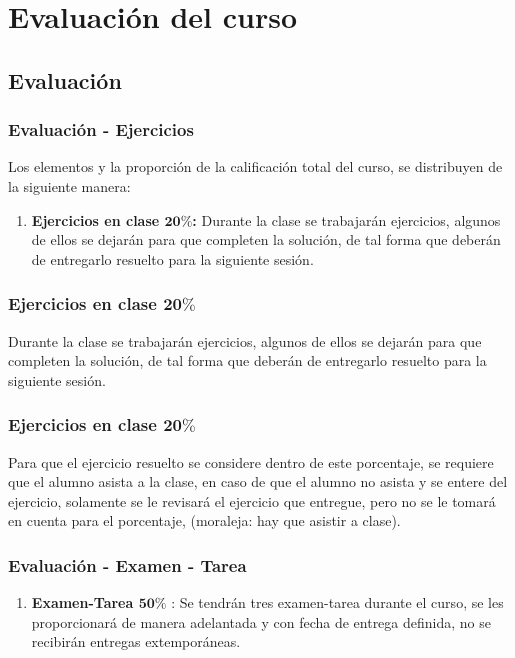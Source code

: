 \documentclass[12pt]{beamer}
\begin{document}
\section{Evaluación del curso}
\subsection{Evaluación}

\begin{frame}
\frametitle{Evaluación - Ejercicios}
Los elementos y la proporción de la calificación total del curso, se distribuyen de la siguiente manera:
\begin{enumerate}[<+->]
\item \textbf{Ejercicios en clase $\mathbf{20\%}$:} Durante la clase se trabajarán ejercicios, algunos de ellos se dejarán para que completen la solución, de tal forma que deberán de entregarlo resuelto para la siguiente sesión.
\\
\bigskip
\pause
\seti
\end{enumerate}
\end{frame}
\begin{frame}
\frametitle{Ejercicios en clase $\mathbf{20\%}$}
Durante la clase se trabajarán ejercicios, algunos de ellos se dejarán para que completen la solución, de tal forma que deberán de entregarlo resuelto para la siguiente sesión.
\end{frame}
\begin{frame}
\frametitle{Ejercicios en clase $\mathbf{20\%}$}
Para que el ejercicio resuelto se considere dentro de este porcentaje, se requiere que el alumno asista a la clase, en caso de que el alumno no asista y se entere del ejercicio, solamente se le revisará el ejercicio que entregue, pero no se le tomará en cuenta para el porcentaje, (moraleja: hay que asistir a clase).
\end{frame}
\begin{frame}
\frametitle{Evaluación - Examen - Tarea}
\begin{enumerate}[<+->]    
\conti
\item \textbf{Examen-Tarea $\mathbf{50\%}$} : Se tendrán tres examen-tarea durante el curso, se les proporcionará de manera adelantada y con fecha de entrega definida, no se recibirán entregas extemporáneas.
\seti
\end{enumerate}
\end{frame}
\end{document}
